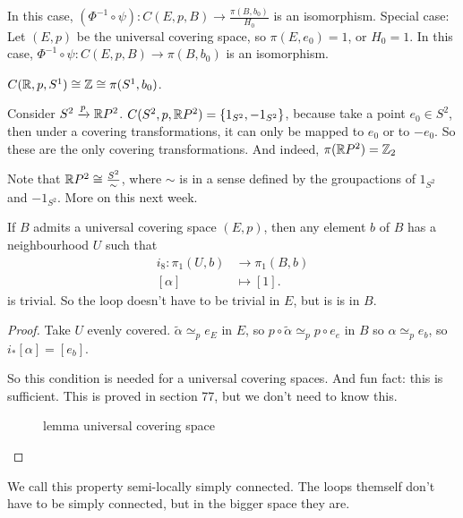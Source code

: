In this case, $(\Phi^{-1}  \circ  \psi): C(E, p, B) \to  \frac{\pi(B,b_0) }{H_0}$ is an isomorphism.
Special case: Let $(E, p)$ be the universal covering space, so $\pi(E,e_0)  = 1$, or $H_0 = 1$.
In this case, $\Phi^{-1}  \circ  \psi: C(E, p, B) \to  \pi(B,b_0) $ is an isomorphism.

\begin{eg}
    $C(\mathbb{R}, p, S^1) \cong \mathbb{Z} \cong \pi(S^{1}, b_0)$.
\end{eg}
\begin{eg}
    Consider $S^2 \xrightarrow{p} \mathbb{R} P^2$.
    $C(S^2, p, \mathbb{R} P^2) = \{1_{S^2}, -1_{S^2}\}$,
    because take a point $e_0 \in S^2$, then under a covering transformations, it can only be mapped to $e_0$ or to $-e_0$.
    So these are the only covering transformations.
    And indeed, $\pi(\mathbb{R} P^2) = \mathbb{Z}_2$

    Note that $\mathbb{R} P^2 \cong \frac{S^2}{\sim}$, where $\sim $ is in a sense defined by the groupactions of $1_{S^2}$ and $-1_{S^2}$. More on this next week.
\end{eg}

\begin{lemma}[75.4]
    If $B$ admits a universal covering space $(E, p)$, then any element $b$ of $B$ has a neighbourhood $U$ such that
    \begin{align*}
        i_8: \pi_1(U, b) &\longrightarrow \pi_1(B, b) \\
        [\alpha] &\longmapsto [1]
    .\end{align*}
    is trivial. So the loop doesn't have to be trivial in $E$, but is is in $B$.
\end{lemma}
\begin{proof}

    Take $U$ evenly covered.
    $\tilde{\alpha} \simeq_p e_E$ in $E$, so  $p  \circ  \tilde{\alpha} \simeq_p  p  \circ  e_e$ in $B$ so $\alpha \simeq_p e_b$, so $i_*[\alpha] = [e_b]$.

    So this condition is needed for a universal covering spaces.
    And fun fact: this is sufficient.
    This is proved in section 77, but we don't need to know this.
\begin{figure}[H]
    \centering
    \caption{lemma universal covering space}
    \label{fig:lemma-universal-covering-space}
\end{figure}
\end{proof}

We call this property semi-locally simply connected.
The loops themself don't have to be simply connected, but in the bigger space they are.




